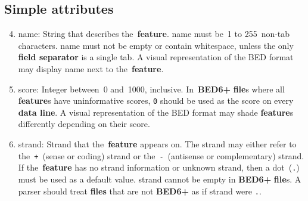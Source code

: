 \documentclass[11pt]{article}
\begin{document}
\subsection{Simple attributes}
\begin{enumerate}
  \setcounter{enumi}{3}

\item \textsf{name}: String that describes the~\textbf{feature}.
  \textsf{name} must be~1 to 255~non-tab characters.
  \textsf{name} must not be empty or contain whitespace, unless the only \textbf{field separator} is a single tab.
  A visual representation of the \ac{BED} format may display \textsf{name} next to the~\textbf{feature}.

\item \textsf{score}: Integer between~0 and~1000, inclusive.
  In~\textbf{BED6+} \textbf{file}s where all \textbf{feature}s have uninformative \textsf{score}s, \texttt{0} should be used as the \textsf{score} on every \textbf{data line}.
  A visual representation of the \ac{BED} format may shade \textbf{feature}s differently depending on their \textsf{score}.

\item \textsf{strand}: Strand that the~\textbf{feature} appears on.
  The \textsf{strand} may either refer to the~\texttt{+}~(sense or coding) strand or the~\texttt{-}~(antisense or complementary) strand.
  If the~\textbf{feature} has no \textsf{strand} information or unknown \textsf{strand}, then a dot~(\texttt{.}) must be used as a default value.
  \textsf{strand} cannot be empty in \textbf{BED6+} \textbf{file}s.
  A parser should treat \textbf{files} that are not \textbf{BED6+} as if \textsf{strand} were \texttt{.}.
\end{enumerate}
\end{document}

